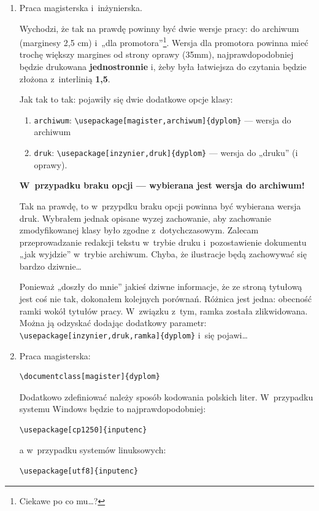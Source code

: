 \begin{enumerate}
\item
Praca magisterska i~inżynierska.

Wychodzi, że tak na prawdę powinny być dwie wersje pracy: do archiwum (marginesy 2,5 cm) i~„dla promotora”\footnote{Ciekawe po co mu…?}. Wersja dla promotora powinna mieć trochę większy margines od strony oprawy (35mm), najprawdopodobniej będzie drukowana \textbf{jednostronnie} i, żeby była łatwiejsza do czytania będzie złożona z~interlinią \textbf{1,5}.

Jak tak to tak:  pojawiły się dwie dodatkowe opcje klasy:
\begin{enumerate}
\item
\texttt{archiwum}: \verb|\usepackage[magister,archiwum]{dyplom}| — wersja do archiwum
\item
\texttt{druk}: \verb|\usepackage[inzynier,druk]{dyplom}| — wersja do „druku” (i oprawy).
\end{enumerate}
\textbf{W~przypadku braku opcji — wybierana jest wersja do archiwum!}

Tak na prawdę, to w~przypdku braku opcji powinna być wybierana wersja druk. Wybrałem jednak opisane wyzej zachowanie, aby zachowanie zmodyfikowanej klasy było zgodne z~dotychczasowym. Zalecam przeprowadzanie redakcji tekstu w~trybie druku i~pozostawienie dokumentu „jak wyjdzie” w~trybie archiwum. Chyba, że ilustracje będą zachowywać się bardzo dziwnie…

Ponieważ „doszły do mnie” jakieś dziwne informacje, że ze stroną tytułową jest coś nie tak, dokonałem kolejnych porównań. Różnica jest jedna: obecność ramki wokół tytułów pracy. W~związku z~tym, ramka została zlikwidowana. Można ją odzyskać dodając dodatkowy parametr: \verb|\usepackage[inzynier,druk,ramka]{dyplom}| i~się pojawi…
\item
Praca magisterska:
\begin{verbatim}
\documentclass[magister]{dyplom}
\end{verbatim}
Dodatkowo zdefiniować należy sposób kodowania polskich liter. W~przypadku systemu Windows będzie to najprawdopodobniej:
\begin{verbatim}
\usepackage[cp1250]{inputenc}
\end{verbatim}
a w~przypadku systemów linuksowych:
\begin{verbatim}
\usepackage[utf8]{inputenc}
\end{verbatim}


\end{enumerate}
